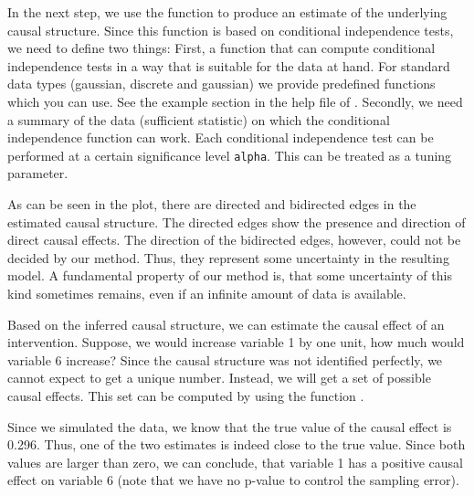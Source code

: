 \documentclass[article]{jss}
\begin{document}
In the next step, we use the function  to produce an estimate of
the underlying causal structure. Since this function is based on
conditional independence tests, we need to define two things: First, a
function that can compute conditional independence tests in a way that is
suitable for the data at hand. For standard data types (gaussian, discrete
and gaussian) we provide predefined functions which you can use. See the
example section in the help file of . Secondly, we need a summary
of the data (sufficient statistic) on which the conditional independence
function can work. Each conditional independence test can be performed at a
certain significance level \texttt{alpha}. This can be treated as a tuning
parameter.

As can be seen in the plot, there are directed and bidirected edges in the
estimated causal structure. The directed edges show the presence and
direction of direct causal effects. The direction of the bidirected edges,
however, could not be decided by our method. Thus, they represent some
uncertainty in the resulting model. A fundamental property of our method
is, that some uncertainty of this kind sometimes remains, even if an
infinite amount of data is available.

Based on the inferred causal structure, we can estimate the causal
effect of an intervention. Suppose, we would increase variable 1 by
one unit, how much would variable 6 increase? Since the causal structure
was not identified perfectly, we cannot expect to get a unique
number. Instead, we will get a set of possible causal effects. This set can
be computed by using the function .

Since we simulated the data, we know that the true value of the causal
effect is 0.296. Thus, one of the two estimates is indeed close to the true
value. Since both values are larger than zero, we can conclude, that
variable 1 has a positive causal effect on variable 6 (note that we have no
p-value to control the sampling error).
\end{document}
